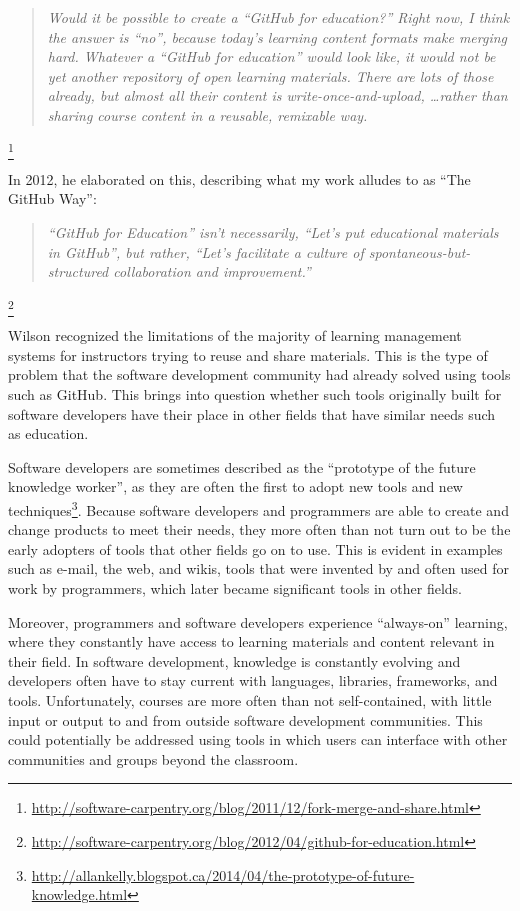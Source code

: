 \begin{quote}\textit{Would it be possible to create a ``GitHub for education?'' Right now, I think the answer is ``no'', because today's learning content formats make merging hard. Whatever a ``GitHub for education'' would look like, it would not be yet another repository of open learning materials. There are lots of those already, but almost all their content is write-once-and-upload, \ldots rather than sharing course content in a reusable, remixable way.}\end{quote}\footnote{\url{http://software-carpentry.org/blog/2011/12/fork-merge-and-share.html}}

In 2012, he elaborated on this, describing what my work alludes to as ``The GitHub Way'':

\begin{quote}\textit{``GitHub for Education'' isn’t necessarily, ``Let’s put educational materials in GitHub'', but rather, ``Let’s facilitate a culture of spontaneous-but-structured collaboration and improvement.''}\end{quote}\footnote{\url{http://software-carpentry.org/blog/2012/04/github-for-education.html}}

Wilson recognized the limitations of the majority of learning management systems for instructors trying to reuse and share materials. This is the type of problem that the software development community had already solved using tools such as GitHub. This brings into question whether such tools originally built for software developers have their place in other fields that have similar needs such as education.

Software developers are sometimes described as the ``prototype of the future knowledge worker'', as they are often the first to adopt new tools and new techniques\footnote{\url{http://allankelly.blogspot.ca/2014/04/the-prototype-of-future-knowledge.html}}. Because software developers and programmers are able to create and change products to meet their needs, they more often than not turn out to be the early adopters of tools that other fields go on to use. This is evident in examples such as e-mail, the web, and wikis, tools that were invented by and often used for work by programmers, which later became significant tools in other fields.


Moreover, programmers and software developers experience ``always-on'' learning, where they constantly have access to learning materials and content relevant in their field. In software development, knowledge is constantly evolving and developers often have to stay current with languages, libraries, frameworks, and tools. Unfortunately, courses are more often than not self-contained, with little input or output to and from outside software development communities. This could potentially be addressed using tools in which users can interface with other communities and groups beyond the classroom.


